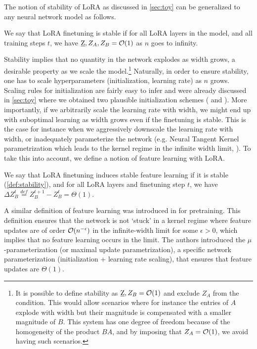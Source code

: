 The notion of stability of LoRA as discussed in \cref{sec:toy} can be generalized to any neural network model as follows.
\begin{defn}[Stability]\label{def:stability} 
We say that LoRA finetuning is stable if for all LoRA layers in the model, and all training steps $t$, we have $\underbar{Z}, Z_A, Z_B = \mathcal{O}(1)$ as $n$ goes to infinity.
\end{defn}
Stability implies that no quantity in the network explodes as width grows, a desirable property as we scale the model.\footnote{It is possible to define stability as $\underbar{Z}, Z_B=\mathcal{O}(1)$ and exclude $Z_A$ from the condition. This would allow scenarios where for instance the entries of $A$ explode with width but their magnitude is compensated with a smaller magnitude of $B$. This system has one degree of freedom because of the homogeneity of the product $BA$, and by imposing that $Z_A=\mathcal{O}(1)$, we avoid having such scenarios.} Naturally, in order to ensure stability, one has to scale hyperparameters (initialization, learning rate) as $n$ grows. Scaling rules for initialization are fairly easy to infer and were already discussed in \cref{sec:toy} where we obtained two plausible initialization schemes ( and ). More importantly, if we arbitrarily scale the learning rate with width, we might end up with suboptimal learning as width grows even if the finetuning is stable. This is the case for instance when we aggressively downscale the learning rate with width, or inadequately parameterize the network (e.g. Neural Tangent Kernel parametrization which leads to the kernel regime in the infinite width limit, \cite{jacot2018neural}).
To take this into account, we define a notion of feature learning with LoRA.
\begin{defn}\label{def:stable_feature_learning_lora} 
We say that LoRA finetuning induces stable feature
learning if it is stable (\cref{def:stability}), and for all LoRA layers and finetuning step $t$, we have $\Delta Z_B^t \overset{def}{=} Z_B^{t+1} - Z_B^t = \Theta(1)$.
\end{defn}
A similar definition of feature learning was introduced in \cite{yang2023tensor} for pretraining. This definition ensures that the network is not `stuck' in a kernel regime where feature updates are of order $\mathcal{O}(n^{-\epsilon})$  in the infinite-width limit for some $\epsilon > 0$, which implies that no feature learning occurs in the limit. The authors introduced the $\mu$-parameterization (or maximal update parametrization), a specific network parameterization (initialization + learning rate scaling), that ensures that feature updates are $\Theta(1)$.
